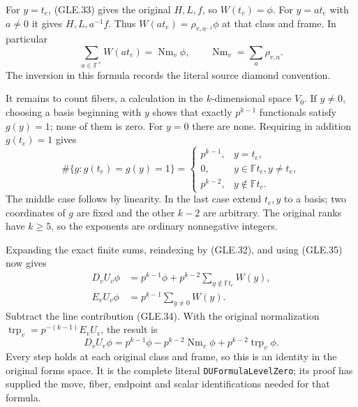 For $y=t_e$, (GLE.33) gives the original $H,L,f$, so $W(t_e)=\phi$.
For $y=a t_e$ with $a\ne0$ it gives $H,L,a^{-1}f$.  Thus
$W(a t_e)=\rho_{v,a^{-1}}\phi$ at that class and frame.  In
particular
\[
             \sum_{a\in\mathbb F^\times} W(a t_e)
                       =\operatorname{Nm}_v\phi,\qquad
             \operatorname{Nm}_v=\sum_a\rho_{v,a}.             \tag{GLE.34}
\]
The inversion in this formula records the literal source diamond
convention.

It remains to count fibers, a calculation in the $k$-dimensional
space $V_0$.  If $y\ne0$, choosing a basis beginning with $y$
shows that exactly $p^{k-1}$ functionals satisfy $g(y)=1$;
none of them is zero.  For $y=0$ there are none.
Requiring in addition $g(t_e)=1$ gives
\[
 \#\{g:g(t_e)=g(y)=1\}=
 \begin{cases}
 p^{k-1},&y=t_e,\\
 0,&y\in\mathbb F t_e, y\ne t_e,\\
 p^{k-2},&y\notin\mathbb F t_e.
 \end{cases}                                                  \tag{GLE.35}
\]
The middle case follows by linearity.  In the last case extend
$t_e,y$ to a basis; two coordinates of $g$ are fixed and the other
$k-2$ are arbitrary.  The original ranks have $k\ge5$, so the
exponents are ordinary nonnegative integers.

Expanding the exact finite sums, reindexing by (GLE.32), and using
(GLE.35) now gives
\[
 \begin{split}
 D_vU_v\phi&=p^{k-1}\phi+
                   p^{k-2}\sum_{y\notin\mathbb F t_e}W(y),\\
 E_vU_v\phi&=p^{k-1}\sum_{y\ne0}W(y).
 \end{split}
\]
Subtract the line contribution (GLE.34).  With the original
normalization $\operatorname{trp}_v=p^{-(k-1)}E_vU_v$, the result is
\[
 D_vU_v\phi=p^{k-1}\phi-p^{k-2}\operatorname{Nm}_v\phi
                              +p^{k-2}\operatorname{trp}_v\phi. \tag{GLE.36}
\]
Every step holds at each original class and frame, so this is an
identity in the original forms space.  It is the complete literal
\texttt{DUFormulaLevelZero}; its proof has supplied the move,
fiber, endpoint and scalar identifications needed for that formula.

